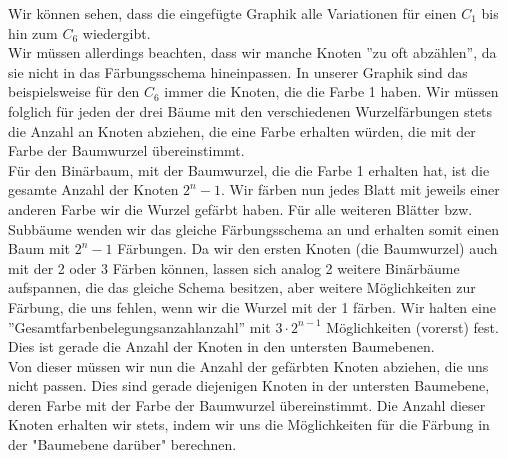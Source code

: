      Wir können sehen, dass die eingefügte Graphik alle Variationen für einen $C_1$ bis hin zum $C_6$  wiedergibt. \\
     Wir müssen allerdings beachten, dass wir manche Knoten ''zu oft abzählen'', da sie nicht in das 
     Färbungsschema hineinpassen. In unserer Graphik sind das beispielsweise für den $C_6$  immer die 
     Knoten, die die Farbe 1 haben. Wir müssen folglich für jeden der drei Bäume  mit den verschiedenen 
     Wurzelfärbungen stets die Anzahl an Knoten abziehen, die eine Farbe erhalten würden, die mit der 
     Farbe der Baumwurzel übereinstimmt.\\

     Für den Binärbaum, mit der Baumwurzel, die die Farbe 1 erhalten hat, ist die gesamte Anzahl der 
     Knoten $2^n-1$. Wir färben nun jedes Blatt mit jeweils einer anderen Farbe wir die Wurzel gefärbt 
     haben. Für alle weiteren Blätter bzw. Subbäume wenden wir das gleiche Färbungsschema an und erhalten 
     somit einen Baum mit $2^n-1$ Färbungen. Da wir den ersten Knoten (die Baumwurzel) auch mit der 2 
     oder 3 Färben können, lassen sich analog 2 weitere Binärbäume aufspannen, die das gleiche Schema 
     besitzen, aber weitere Möglichkeiten zur Färbung, die uns fehlen, wenn wir die Wurzel mit der 1 
     färben. Wir halten eine ''Gesamtfarbenbelegungsanzahlanzahl'' mit $3\cdot 2^{n-1}$ Möglichkeiten 
     (vorerst) fest. Dies ist gerade die Anzahl der Knoten in den untersten Baumebenen.\\

     Von dieser müssen wir nun die Anzahl der gefärbten Knoten abziehen, die uns nicht passen. Dies 
     sind gerade diejenigen Knoten in der untersten Baumebene, deren Farbe mit der Farbe der Baumwurzel 
     übereinstimmt. Die Anzahl dieser Knoten erhalten wir stets, indem wir uns die Möglichkeiten für 
     die Färbung in der "Baumebene darüber" berechnen.\\
     
